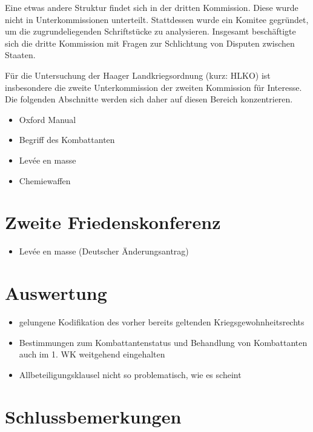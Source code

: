\documentclass[12pt]{scrartcl}
\begin{document}
Eine etwas andere Struktur findet sich in der dritten Kommission. Diese wurde nicht in Unterkommissionen unterteilt. Stattdessen wurde ein Komitee gegründet, um die zugrundeliegenden Schriftstücke zu analysieren. Insgesamt beschäftigte sich die dritte Kommission mit Fragen zur Schlichtung von Disputen zwischen Staaten.\cite{Scott1920}

Für die Untersuchung der Haager Landkriegsordnung (kurz: HLKO) ist insbesondere die zweite Unterkommission der zweiten Kommission für Interesse. Die folgenden Abschnitte werden sich daher auf diesen Bereich konzentrieren.

\begin{itemize}
	\item Oxford Manual
\end{itemize}
\begin{itemize}
	\item Begriff des Kombattanten\cite{Buss1992}
	\item Levée en masse\cite{Scott1920}
	\item Chemiewaffen\cite{Scott1920}
\end{itemize}
\section{Zweite Friedenskonferenz}
\begin{itemize}
	\item Levée en masse (Deutscher Änderungsantrag)
\end{itemize}
\section{Auswertung}
\begin{itemize}
	\item gelungene Kodifikation des vorher bereits geltenden Kriegsgewohnheitsrechts
	\item Bestimmungen zum Kombattantenstatus und Behandlung von Kombattanten auch im 1. WK weitgehend eingehalten
	\item Allbeteiligungsklausel nicht so problematisch, wie es scheint
\end{itemize}
\cite{Gasser1991}
\cite{Lingen2014}
\cite{Fraenkel1968}
\cite{Heffter1951}
\cite{DeutschesReich2010}
\cite{Scott1921}



\section{Schlussbemerkungen}


\newpage

\printbibliography
{}


\newpage
{}
\end{document}

